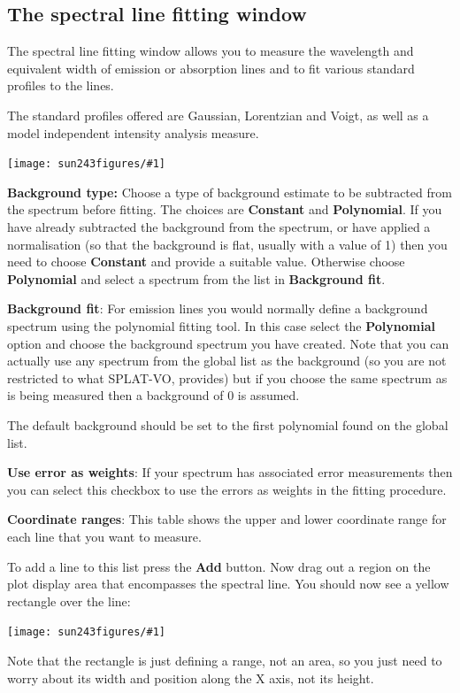 \documentclass[twoside,11pt]{article}
\newcommand{\htmladdimg}[1]{}
\newcommand{\latexhtml}[2]{#1}
\renewcommand{\_}{\texttt{\symbol{95}}}
\newcommand{\SPLAT}{\textsf{SPLAT-VO}}
\newcommand{\mainfigure}[1]
{\begin{center}
 \latexhtml{\texttt{[image: sun243\_figures/\#1]}}{\htmladdimg{#1.gif}}
 \end{center}
}
\newcommand{\labelitem}[1]{\textbf{#1}}
\begin{document}
\newpage
\subsection{The spectral line fitting window}

The spectral line fitting window allows you to measure the wavelength
and equivalent width of emission or absorption lines and to fit
various standard profiles to the lines.

The standard profiles offered are Gaussian, Lorentzian and Voigt, as
well as a model independent intensity analysis measure.

\mainfigure{linefitwindow}

\labelitem{Background type:} Choose a type of background estimate to
be subtracted from the spectrum before fitting. The choices are
\labelitem{Constant} and \labelitem{Polynomial}. If you have already
subtracted the background from the spectrum, or have applied a
normalisation (so that the background is flat, usually with a value of
1) then you need to choose \labelitem{Constant} and provide a suitable
value. Otherwise choose \labelitem{Polynomial} and select a spectrum
from the list in \labelitem{Background fit}.

\labelitem{Background fit}: For emission lines you would normally
define a background spectrum using the polynomial fitting tool. In
this case select the \labelitem{Polynomial} option and choose the
background spectrum you have created. Note that you can actually use
any spectrum from the global list as the background (so you are not
restricted to what \SPLAT, provides) but if you choose the same
spectrum as is being measured then a background of $0$ is assumed.

The default background should be set to the first polynomial found on
the global list.

\labelitem{Use error as weights}: If your spectrum has associated
error measurements then you can select this checkbox to use the errors
as weights in the fitting procedure.

\labelitem{Coordinate ranges}: This table shows the upper and lower
coordinate range for each line that you want to measure.

To add a line to this list press the \labelitem{Add} button. Now drag
out a region on the plot display area that encompasses the spectral
line. You should now see a yellow rectangle over the line:

\mainfigure{linefitplotwindow}

Note that the rectangle is just defining a range, not an area, so you
just need to worry about its width and position along the X axis, not
its height.
\end{document}
